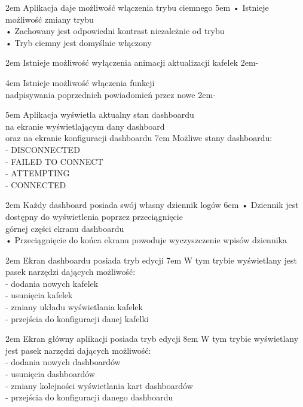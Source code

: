 {2em}{
    Aplikacja daje możliwość włączenia trybu ciemnego
}
{5em}{
    • Istnieje możliwość zmiany trybu\\
    • Zachowany jest odpowiedni kontrast niezależnie od trybu\\
    • Tryb ciemny jest domyślnie włączony
}

{2em}{
    Istnieje możliwość wyłączenia animacji aktualizacji kafelek
}
{2em}{-}

{4em}{
    Istnieje możliwość włączenia funkcji\\
    nadpisywania poprzednich powiadomień przez nowe
}
{2em}{-}

{5em}{
    Aplikacja wyświetla aktualny stan dashboardu\\
    na ekranie wyświetlającym dany dashboard\\
    oraz na ekranie konfiguracji dashboardu
}
{7em}{
    Możliwe stany dashboardu:\\
    - DISCONNECTED\\
    - FAILED TO CONNECT\\
    - ATTEMPTING\\
    - CONNECTED
}

{2em}{
    Każdy dashboard posiada swój własny dziennik logów
}
{6em}{
    • Dziennik jest dostępny do wyświetlenia poprzez przeciągnięcie\\
    \hspace*{0.5em} górnej części ekranu dashboardu\\

    • Przeciągnięcie do końca ekranu powoduje wyczyszczenie wpisów dziennika
}

{2em}{
    Ekran dashboardu posiada tryb edycji
}
{7em}{
    W tym trybie wyświetlany jest pasek narzędzi dających możliwość:\\
    - dodania nowych kafelek\\
    - usunięcia kafelek\\
    - zmiany układu wyświetlania kafelek\\
    - przejścia do konfiguracji danej kafelki
}

{2em}{
    Ekran główny aplikacji posiada tryb edycji
}
{8em}{
    W tym trybie wyświetlany jest pasek narzędzi dających możliwość:\\
    - dodania nowych dashboardów\\
    - usunięcia dashboardów\\
    - zmiany kolejności wyświetlania kart dashboardów\\
    - przejścia do konfiguracji danego dashboardu
}

